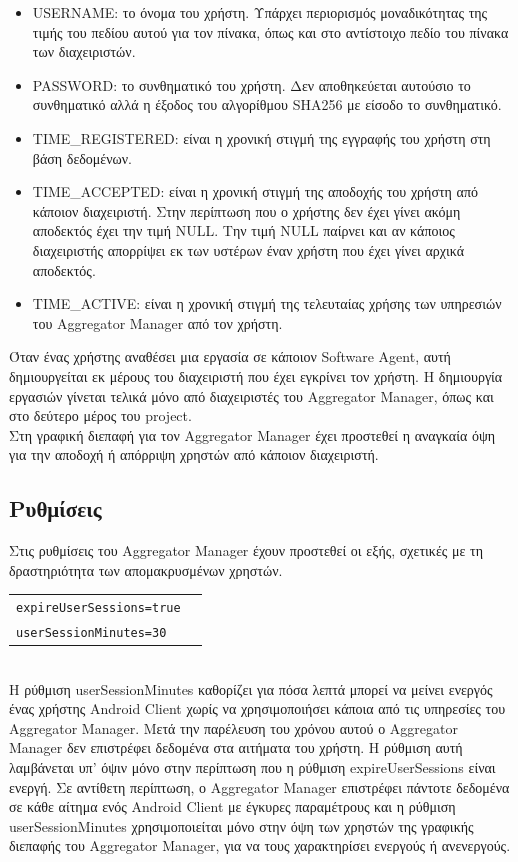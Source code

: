 \documentclass[a4paper,11pt]{article}
\begin{document}
\begin{sloppypar}
\begin{itemize}
\item USERNAME: το όνομα του χρήστη. Υπάρχει περιορισμός μοναδικότητας της τιμής του πεδίου αυτού για τον πίνακα, όπως και στο αντίστοιχο πεδίο του πίνακα των διαχειριστών.

\item PASSWORD: το συνθηματικό του χρήστη. Δεν αποθηκεύεται αυτούσιο το συνθηματικό αλλά η έξοδος του αλγορίθμου SHA256 με είσοδο το συνθηματικό. 

\item TIME\_REGISTERED: είναι η χρονική στιγμή της εγγραφής του χρήστη στη βάση δεδομένων.

\item TIME\_ACCEPTED: είναι η χρονική στιγμή της αποδοχής του χρήστη από κάποιον διαχειριστή. Στην περίπτωση που ο χρήστης δεν έχει γίνει ακόμη αποδεκτός έχει την τιμή NULL. Την τιμή NULL παίρνει και αν κάποιος διαχειριστής απορρίψει εκ των υστέρων έναν χρήστη που έχει γίνει αρχικά αποδεκτός.

\item TIME\_ACΤIVE: είναι η χρονική στιγμή της τελευταίας χρήσης των υπηρεσιών του Aggregator Manager από τον χρήστη.

\end{itemize}
Όταν ένας χρήστης αναθέσει μια εργασία σε κάποιον Software Agent, αυτή δημιουργείται εκ μέρους του διαχειριστή που έχει εγκρίνει τον χρήστη. Η δημιουργία εργασιών γίνεται τελικά μόνο από διαχειριστές του Aggregator Manager, όπως και στο δεύτερο μέρος του project. 
\\
Στη γραφική διεπαφή για τον Aggregator Manager έχει προστεθεί η αναγκαία όψη για την αποδοχή ή απόρριψη χρηστών από κάποιον διαχειριστή.

\subsection{Ρυθμίσεις}

Στις ρυθμίσεις του Aggregator Manager έχουν προστεθεί οι εξής, σχετικές με τη δραστηριότητα των απομακρυσμένων χρηστών.
\\

\noindent\begin{tabular}{lp{11cm}}

\texttt{expireUserSessions=true}\\
\texttt{userSessionMinutes=30}\\
\end{tabular}
\\

Η ρύθμιση userSessionMinutes καθορίζει για πόσα λεπτά μπορεί να μείνει ενεργός ένας χρήστης Android Client χωρίς να χρησιμοποιήσει κάποια από τις υπηρεσίες του Aggregator Manager. Μετά την παρέλευση του χρόνου αυτού ο Aggregator Manager δεν επιστρέφει δεδομένα στα αιτήματα του χρήστη. Η ρύθμιση αυτή λαμβάνεται υπ' όψιν μόνο στην περίπτωση που η ρύθμιση expireUserSessions είναι ενεργή. Σε αντίθετη περίπτωση, ο Aggregator Manager επιστρέφει πάντοτε δεδομένα σε κάθε αίτημα ενός Android Client με έγκυρες παραμέτρους και η ρύθμιση userSessionMinutes χρησιμοποιείται μόνο στην όψη των χρηστών της γραφικής διεπαφής του Aggregator Manager, για να τους χαρακτηρίσει ενεργούς ή ανενεργούς.


\end{sloppypar}
\end{document}
